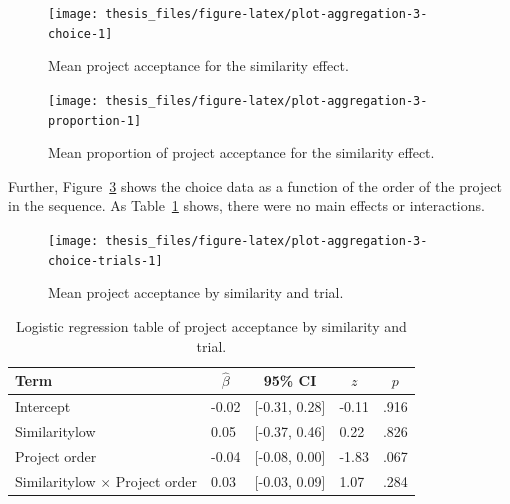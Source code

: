 \documentclass[a4paper, nobind, dvipsnames]{templates/ociamthesis}
\theoremstyle{definition}
\theoremstyle{definition}
\theoremstyle{definition}
\theoremstyle{definition}
\theoremstyle{remark}
\begin{document}
\begin{figure}
\texttt{[image: thesis\_files/figure-latex/plot-aggregation-3-choice-1]} \caption{Mean project acceptance for the similarity effect.}\label{fig:plot-aggregation-3-choice}
\end{figure}



\begin{figure}
\texttt{[image: thesis\_files/figure-latex/plot-aggregation-3-proportion-1]} \caption{Mean proportion of project acceptance for the similarity effect.}\label{fig:plot-aggregation-3-proportion}
\end{figure}

Further, Figure~\ref{fig:plot-aggregation-3-choice-trials} shows the choice
data as a function of the order of the project in the sequence. As
Table~\ref{tab:similarity-project-order} shows, there were no main effects or
interactions.



\begin{figure}
\texttt{[image: thesis\_files/figure-latex/plot-aggregation-3-choice-trials-1]} \caption{Mean project acceptance by similarity and trial.}\label{fig:plot-aggregation-3-choice-trials}
\end{figure}

\begin{table}[tbp]

\begin{center}
\begin{threeparttable}

\caption{\label{tab:similarity-project-order}Logistic regression table of project acceptance by similarity and trial.}

\begin{tabular}{lllll}
\toprule
Term & \multicolumn{1}{c}{$\hat{\beta}$} & \multicolumn{1}{c}{95\% CI} & \multicolumn{1}{c}{$z$} & \multicolumn{1}{c}{$p$}\\
\midrule
Intercept & -0.02 & {}[-0.31, 0.28] & -0.11 & .916\\
Similaritylow & 0.05 & {}[-0.37, 0.46] & 0.22 & .826\\
Project order & -0.04 & {}[-0.08, 0.00] & -1.83 & .067\\
Similaritylow $\times$ Project order & 0.03 & {}[-0.03, 0.09] & 1.07 & .284\\
\bottomrule
\end{tabular}

\end{threeparttable}
\end{center}

\end{table}
\end{document}
